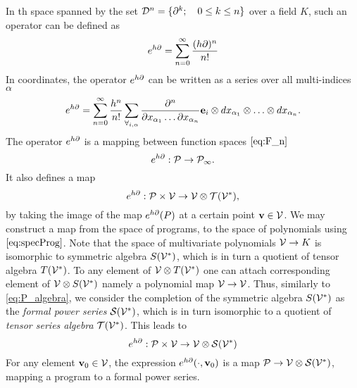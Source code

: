 In th space spanned by the set $\mathcal{D}^n=\{\partial^k;\quad 0\le k\le n\}$ over a field $K$, such an operator can be defined as
 \begin{equation*}
  e^{h\partial}=\sum\limits_{n=0}^{\infty}\frac{(h\partial)^n}{n!}
 \end{equation*}
 In coordinates, the operator $e^{h\partial}$ can be written as a
 series over all multi-indices $\alpha$
 \begin{equation}\label{eq:e^d}
  e^{h\partial}=\sum\limits_{n=0}^{\infty}\frac{h^n}{n!}\sum_{\forall_{i,\alpha}}\frac{\partial^n}{\partial
        x_{\alpha_1}\ldots \partial x_{\alpha_n}}\mathbf{e}_i\otimes
      dx_{\alpha_1}\otimes\ldots \otimes dx_{\alpha_n}.
 \end{equation}
The operator $e^{h\partial}$ is a mapping between function spaces $\eqref{eq:F_n}$
 \begin{equation*}
  e^{h\partial}:\mathcal{P}\to\mathcal{P}_\infty.
 \end{equation*}
 It also defines a map
  \begin{equation}\label{eq:specProg}
    e^{h\partial}:\mathcal{P}\times \mathcal{V}\to \mathcal{V}\otimes \mathcal{T}(\mathcal{V}^*),
  \end{equation}
by taking the image of the map $e^{h\partial}(P)$ at a certain point $\mathbf{v}\in \mathcal{V}$.  
We may construct a map from the space of programs,
to the space of polynomials using  $\eqref{eq:specProg}$. Note that the space of
multivariate polynomials 
$\mathcal{V}\to K$ is isomorphic to symmetric algebra $S(\mathcal{V}^*)$, which is in turn a
quotient of tensor algebra $T(\mathcal{V}^*)$.
To any element of
 $\mathcal{V}\otimes T(\mathcal{V}^*)$ one can attach corresponding element of $\mathcal{V}\otimes S(\mathcal{V}^*)$
 namely a polynomial map  $\mathcal{V}\to \mathcal{V}$. Thus, similarly to \eqref{eq:P_algebra}, we consider the completion of the symmetric algebra $S(\mathcal{V}^*)$ as the \emph{formal power series} $\mathcal{S}(\mathcal{V}^{*})$, which is in turn isomorphic to a quotient of \emph{tensor series algebra} $\mathcal{T}(\mathcal{V}^*)$. This leads to 
 \begin{equation}\label{eq:pToPol}
  e^{h\partial}: \mathcal{P}\times \mathcal{V}\to \mathcal{V}\otimes \mathcal{S}(\mathcal{V}^*)
 \end{equation}
 For any element $\mathbf{v}_0\in \mathcal{V}$, the expression $e^{h\partial}(\cdot,\mathbf{v}_0)$ is a map $\mathcal{P}\to
 \mathcal{V}\otimes \mathcal{S}(\mathcal{V}^*)$, mapping a program to a formal power series.

